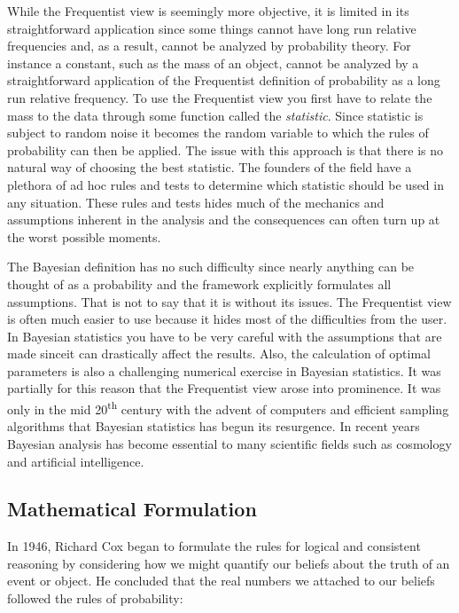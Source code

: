 \documentclass[12pt]{article}
\numberwithin{equation}{section}
\begin{document}
While the Frequentist view is seemingly more objective, it is limited in its straightforward application since some things cannot have long run relative frequencies and, as a result, cannot be analyzed by probability theory. For instance a constant, such as the mass of an object, cannot be analyzed by a straightforward application of the Frequentist definition of probability as a long run relative frequency. To use the Frequentist view you first have to relate the mass to the data through some function called the \emph{statistic}. Since statistic is subject to random noise it becomes the random variable to which the rules of probability can then be applied. The issue with this approach is that there is no natural way of choosing the best statistic.\cite{sivia2006data} The founders of the field have a plethora of ad hoc rules and tests to determine which statistic should be used in any situation. These rules and tests hides much of the mechanics and assumptions inherent in the analysis and the consequences can often turn up at the worst possible moments.

The Bayesian definition has no such difficulty since nearly anything can be thought of as a probability and the framework explicitly formulates all assumptions. That is not to say that it is without its issues. The Frequentist view is often much easier to use because it hides most of the difficulties from the user. In Bayesian statistics you have to be very careful with the assumptions that are made sinceit can drastically affect the results. Also, the calculation of optimal parameters is also a challenging numerical exercise in Bayesian statistics. It was partially for this reason that the Frequentist view arose into prominence. It was only in the mid 20\textsuperscript{th} century with the advent of computers and efficient sampling algorithms that Bayesian statistics has begun its resurgence. In recent years Bayesian analysis has become essential to many scientific fields such as cosmology and artificial intelligence.\cite{von2011bayesian}

\subsection{Mathematical Formulation}
In 1946, Richard Cox began to formulate the rules for logical and consistent reasoning by considering how we might quantify our beliefs about the truth of an event or object. He concluded that the real numbers we attached to our beliefs followed the rules of probability:
\end{document}
